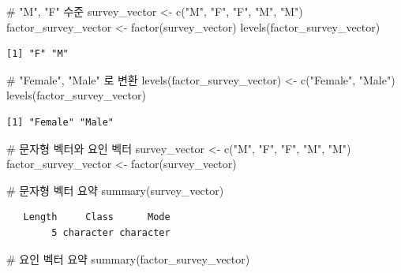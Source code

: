 \documentclass[
  letterpaper,
  chapter,a4paper,showtrims,openright,hidelinks]{oblivoir}
\newenvironment{Shaded}{\begin{snugshade}}{\end{snugshade}}
\newcommand{\CommentTok}[1]{\textcolor[rgb]{0.37,0.37,0.37}{#1}}
\newcommand{\FunctionTok}[1]{\textcolor[rgb]{0.28,0.35,0.67}{#1}}
\newcommand{\NormalTok}[1]{\textcolor[rgb]{0.00,0.23,0.31}{#1}}
\newcommand{\OtherTok}[1]{\textcolor[rgb]{0.00,0.23,0.31}{#1}}
\newcommand{\StringTok}[1]{\textcolor[rgb]{0.13,0.47,0.30}{#1}}
\begin{document}
\begin{Shaded}
\begin{Highlighting}[]
\CommentTok{\# "M", "F" 수준}
\NormalTok{survey\_vector }\OtherTok{\textless{}{-}} \FunctionTok{c}\NormalTok{(}\StringTok{"M"}\NormalTok{, }\StringTok{"F"}\NormalTok{, }\StringTok{"F"}\NormalTok{, }\StringTok{"M"}\NormalTok{, }\StringTok{"M"}\NormalTok{)}
\NormalTok{factor\_survey\_vector }\OtherTok{\textless{}{-}} \FunctionTok{factor}\NormalTok{(survey\_vector)}
\FunctionTok{levels}\NormalTok{(factor\_survey\_vector)}
\end{Highlighting}
\end{Shaded}

\begin{verbatim}
[1] "F" "M"
\end{verbatim}

\begin{Shaded}
\begin{Highlighting}[]
\CommentTok{\# "Female", "Male" 로 변환}
\FunctionTok{levels}\NormalTok{(factor\_survey\_vector) }\OtherTok{\textless{}{-}} \FunctionTok{c}\NormalTok{(}\StringTok{"Female"}\NormalTok{, }\StringTok{"Male"}\NormalTok{)}
\FunctionTok{levels}\NormalTok{(factor\_survey\_vector)}
\end{Highlighting}
\end{Shaded}

\begin{verbatim}
[1] "Female" "Male"  
\end{verbatim}

\begin{Shaded}
\begin{Highlighting}[]
\CommentTok{\# 문자형 벡터와 요인 벡터}
\NormalTok{survey\_vector }\OtherTok{\textless{}{-}} \FunctionTok{c}\NormalTok{(}\StringTok{"M"}\NormalTok{, }\StringTok{"F"}\NormalTok{, }\StringTok{"F"}\NormalTok{, }\StringTok{"M"}\NormalTok{, }\StringTok{"M"}\NormalTok{)}
\NormalTok{factor\_survey\_vector }\OtherTok{\textless{}{-}} \FunctionTok{factor}\NormalTok{(survey\_vector)}

\CommentTok{\# 문자형 벡터 요약}
\FunctionTok{summary}\NormalTok{(survey\_vector)}
\end{Highlighting}
\end{Shaded}

\begin{verbatim}
   Length     Class      Mode 
        5 character character 
\end{verbatim}

\begin{Shaded}
\begin{Highlighting}[]
\CommentTok{\# 요인 벡터 요약}
\FunctionTok{summary}\NormalTok{(factor\_survey\_vector)}
\end{Highlighting}
\end{Shaded}
\end{document}
